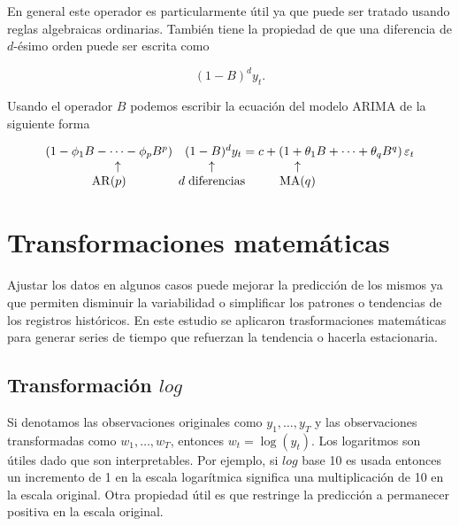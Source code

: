 En general este operador es particularmente útil ya que puede ser tratado usando reglas algebraicas ordinarias. También tiene la propiedad de que una diferencia de $d$-ésimo orden puede ser escrita como

\[
(1-B)^{d} y_{t}.
\]

Usando el operador $B$ podemos escribir la ecuación del modelo ARIMA de la siguiente forma

\begin{equation*}
	\begin{array}{ccc}
		\left(1-\phi_{1} B-\cdots-\phi_{p} B^{p}\right) & (1-B)^{d} y_{t}=c+\left(1+\theta_{1} B+\cdots+\theta_{q} B^{q}\right) \varepsilon_{t}\\
		\hspace{0.5cm}\uparrow & \hspace{-5cm}\uparrow & \hspace{-7cm}\uparrow \\
		\operatorname{AR}(p) & \hspace{-5cm}d\hspace{0.1cm}\text{diferencias} & \hspace{-7cm}\operatorname{MA}(q)
	\end{array}
\end{equation*}
\section{Transformaciones matemáticas}
Ajustar los datos en algunos casos puede mejorar la predicción de los mismos ya que permiten disminuir la variabilidad o simplificar los patrones o tendencias de los registros históricos. En este estudio se aplicaron trasformaciones matemáticas para generar series de tiempo que refuerzan la tendencia o hacerla estacionaria.


\subsection{Transformación $log$}

Si denotamos las observaciones originales como $y_{1}, \ldots, y_{T}$ y las observaciones transformadas como $w_{1}, \ldots, w_{T}$, entonces $w_{t}=\log \left(y_{t}\right)$. Los logaritmos son útiles dado que son interpretables. Por ejemplo, si $log$ base 10 es usada entonces un incremento de 1 en la escala logarítmica significa una multiplicación de 10 en la escala original.  
Otra propiedad útil es que restringe la predicción a permanecer positiva en la escala original. 

